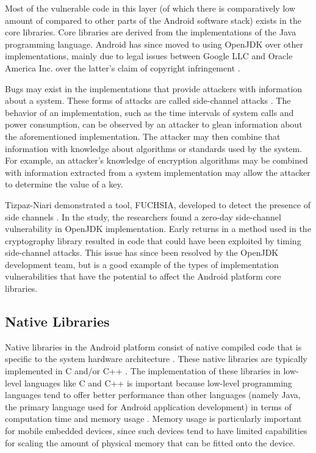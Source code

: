 Most of the vulnerable code in this layer (of which there is comparatively low amount of compared to other parts of the Android software stack) exists in the core libraries.
Core libraries are derived from the implementations of the Java programming language.
Android has since moved to using OpenJDK \cite{OpenJDK2022} over other implementations, mainly due to legal issues between Google LLC and Oracle America Inc. over the latter's claim of copyright infringement \cite{Oyez2020, Amadeo2016}.

Bugs may exist in the implementations that provide attackers with information about a system.
These forms of attacks are called side-channel attacks \cite{Tiri2007}.
The behavior of an implementation, such as the time intervals of system calls and power consumption, can be observed by an attacker to glean information about the aforementioned implementation.
The attacker may then combine that information with knowledge about algorithms or standards used by the system.
For example, an attacker's knowledge of encryption algorithms may be combined with information extracted from a system implementation may allow the attacker to determine the value of a key.

Tizpaz-Niari \etal demonstrated a tool, FUCHSIA, developed to detect the presence of side channels \cite{TizpazNiari2018}.
In the study, the researchers found a zero-day side-channel vulnerability in OpenJDK implementation.
Early returns in a method used in the cryptography library resulted in code that could have been exploited by timing side-channel attacks.
This issue has since been resolved by the OpenJDK development team, but is a good example of the types of implementation vulnerabilities that have the potential to affect the Android platform core libraries.

\subsection{Native Libraries}
Native libraries in the Android platform consist of native compiled code that is specific to the system hardware architecture \cite{AndroidDocs2022Arch}.
These native libraries are typically implemented in C \cite{Kernighan1988} and/or C++ \cite{Stroustrup2013}.
The implementation of these libraries in low-level languages like C and C++ is important because low-level programming languages tend to offer better performance than other languages (namely Java, the primary language used for Android application development) in terms of computation time and memory usage \cite{Prechelt2000}.
Memory usage is particularly important for mobile embedded devices, since such devices tend to have limited capabilities for scaling the amount of physical memory that can be fitted onto the device.

